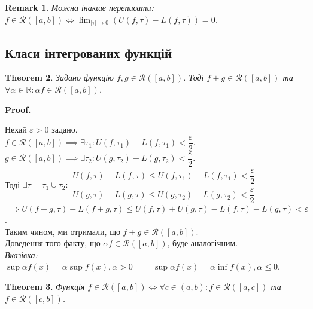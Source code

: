\documentclass[a4paper, 10pt]{article}
\makeatletter
\def\huge{\displaystyle}
\def\qed{$\blacksquare$}
\theoremstyle{theoremdd}
\newtheorem{theorem}{Theorem}[subsection]
\theoremstyle{theoremdd}
\theoremstyle{theoremdd}
\theoremstyle{theoremdd}
\theoremstyle{theoremdd}
\theoremstyle{theoremdd}
\theoremstyle{theoremdd}
\newtheorem{remark}[theorem]{Remark}
\theoremstyle{theoremdd}
\theoremstyle{theoremdd}
\renewenvironment{proof}[1][Proof.\\]{\par
\pushQED{\hfill \qed}%
\normalfont \topsep6\p@\@plus6\p@\relax
\trivlist
\item\relax
{\bfseries
#1\@addpunct{.}}\hspace\labelsep\ignorespaces
}{%
\popQED\endtrivlist\@endpefalse
}
\makeatother
\begin{document}
\begin{remark}
Можна інакше переписати: $f \in \mathcal{R}([a,b]) \iff \huge\lim_{|\tau| \to 0} (U(f,\tau) - L(f,\tau)) = 0$.
\end{remark}

\subsection{Класи інтегрованих функцій}
\begin{theorem}
\label{linearity_of_integrable_functions}
Задано функцію $f,g \in \mathcal{R}([a,b])$. Тоді $f+g \in \mathcal{R}([a,b])$ та $\forall \alpha \in \mathbb{R}: \alpha f \in \mathcal{R}([a,b])$.
\end{theorem}

\begin{proof}
Нехай $\varepsilon > 0$ задано.\\
$f \in \mathcal{R}([a,b]) \implies \exists \tau_1: U(f,\tau_1) - L(f,\tau_1) < \dfrac{\varepsilon}{2}$.\\
$g \in \mathcal{R}([a,b]) \implies \exists \tau_2: U(g,\tau_2) - L(g,\tau_2) < \dfrac{\varepsilon}{2}$.\\
Тоді $\exists \tau = \tau_1 \cup \tau_2: \begin{gathered} U(f,\tau)-L(f,\tau) \leq U(f,\tau_1)-L(f,\tau_1) < \dfrac{\varepsilon}{2} \\
U(g,\tau)-L(g,\tau) \leq U(g,\tau_2) - L(g,\tau_2) < \dfrac{\varepsilon}{2} \end{gathered}$\\
$\implies U(f+g,\tau) - L(f+g,\tau) \leq U(f,\tau) + U(g,\tau) - L(f,\tau) - L(g,\tau) < \varepsilon$.\\
Таким чином, ми отримали, що $f + g \in \mathcal{R}([a,b])$.
\bigskip \\
Доведення того факту, що $\alpha f \in \mathcal{R}([a,b])$, буде аналогічним.\\
\textit{Вказівка: $\huge\sup \alpha f(x) = \alpha \sup f(x), \alpha > 0 \hspace{1cm} \sup \alpha f(x) = \alpha \inf f(x), \alpha \leq 0$}.
\end{proof}

\begin{theorem}
\label{additivity_of_integrable_fucntions}
Функція $f \in \mathcal{R}([a,b]) \iff \forall c \in (a,b): f \in \mathcal{R}([a,c])$ та $f \in \mathcal{R}([c,b])$.
\end{theorem}
\end{document}
